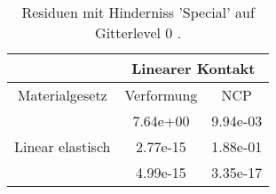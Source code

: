 \begin{table} 
\centering 
\begin{tabular}{c|cc|} 
\cline{2-3} 
 & \multicolumn{2}{|c|}{Linearer Kontakt} \\ 
\hline 
\multicolumn{1}{|c|}{Materialgesetz} & \multicolumn{1}{c|}{Verformung} & \multicolumn{1}{c|}{NCP} \\ 
\hline 
\multicolumn{1}{|c|}{\multirow{3}{*}{Linear elastisch}} &\multicolumn{1}{|c|}{  7.64e+00} & \multicolumn{1}{|c|}{  9.94e-03} \\ 
\multicolumn{1}{|c|}{} & \multicolumn{1}{|c|}{  2.77e-15} & \multicolumn{1}{|c|}{  1.88e-01} \\ 
\multicolumn{1}{|c|}{} & \multicolumn{1}{|c|}{  4.99e-15} & \multicolumn{1}{|c|}{  3.35e-17} \\ 
\hline 
\end{tabular}\caption{Residuen mit Hinderniss 'Special' auf Gitterlevel 0 .}\label{tab:Residuum_Special_level0}
\end{table} 
